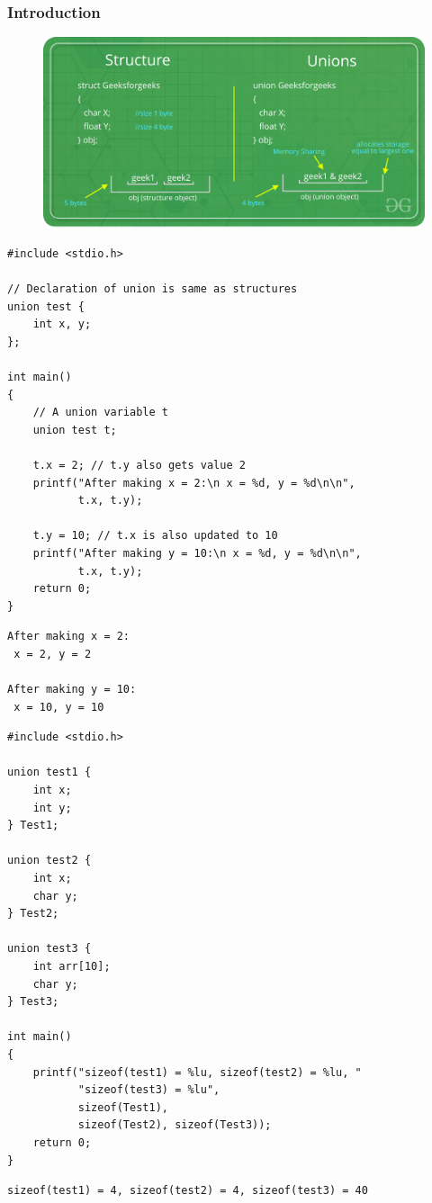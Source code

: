 \documentclass{../c-lecture}
\begin{document}
\begin{frame}
  \frametitle{Introduction}
  \begin{figure}
  \includegraphics[width=\textwidth]{./img/union.png}
  \end{figure}
\end{frame}

\begin{frame}[fragile]
  \scriptsize
  \begin{verbatim}
#include <stdio.h>

// Declaration of union is same as structures
union test {
    int x, y;
};

int main()
{
    // A union variable t
    union test t;

    t.x = 2; // t.y also gets value 2
    printf("After making x = 2:\n x = %d, y = %d\n\n",
           t.x, t.y);

    t.y = 10; // t.x is also updated to 10
    printf("After making y = 10:\n x = %d, y = %d\n\n",
           t.x, t.y);
    return 0;
}
  \end{verbatim}
  \begin{verbatim}
After making x = 2:
 x = 2, y = 2

After making y = 10:
 x = 10, y = 10
  \end{verbatim}
\end{frame}

\begin{frame}[fragile]
  \scriptsize
  \begin{verbatim}
#include <stdio.h>

union test1 {
    int x;
    int y;
} Test1;

union test2 {
    int x;
    char y;
} Test2;

union test3 {
    int arr[10];
    char y;
} Test3;

int main()
{
    printf("sizeof(test1) = %lu, sizeof(test2) = %lu, "
           "sizeof(test3) = %lu",
           sizeof(Test1),
           sizeof(Test2), sizeof(Test3));
    return 0;
}
  \end{verbatim}

  \begin{verbatim}
sizeof(test1) = 4, sizeof(test2) = 4, sizeof(test3) = 40
  \end{verbatim}
\end{frame}
\end{document}
